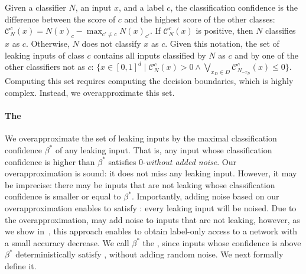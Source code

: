 Given a classifier $N$, an input $x$, and a label $c$,
the classification confidence is the difference between the score of $c$ and the highest score of the other classes: 
%
%
$\mathcal{C}_{N}^c(x) = N(x)_c - \max_{c' \neq c} N(x)_{c'}.$
%
If $\mathcal{C}_N^c(x)$ is positive, then $N$ classifies $x$ as $c$.
Otherwise, $N$ does not classify $x$ as $c$. 
Given this notation, the set of leaking inputs of class $c$ contains all inputs classified by $N$ as $c$ 
and by one of the other classifiers not as $c$:
$\{x\in [0,1]^d \mid \mathcal{C}_{N}^c(x) > 0 \land \bigvee_{x_D \in D} \mathcal{C}_{N_{-x_D}}^c(x) \leq 0\}$. 
Computing this set requires computing the decision boundaries, which is highly complex. 
Instead, we overapproximate this set. %

\paragraph{The \propa}
 We overapproximate the set of leaking inputs by the maximal classification confidence $\beta^*$ of any leaking input. That is, any input whose classification confidence is higher than $\beta^*$ satisfies 0-\propi \emph{without added noise}. Our overapproximation is sound: it does not miss any leaking input. However, it may be imprecise: there may be inputs that are not leaking whose classification confidence is smaller or equal to $\beta^*$. Importantly, adding noise based on our overapproximation enables \tool to satisfy \propi: every leaking input will be noised. Due to the 
  overapproximation, \tool may add noise to inputs that are not leaking, however, as we show in~, this approach enables \tool to obtain label-only access to a network with a small accuracy decrease. 
    We call $\beta^*$ the \emph{\propl}, since inputs whose confidence is above $\beta^*$  deterministically satisfy \propi, without adding random noise.
We next formally define it.

